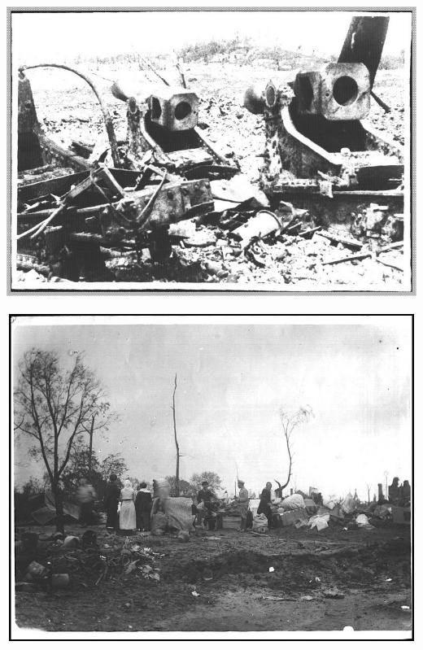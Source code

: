 \begin{center}
\includegraphics[width=\textwidth]{chast-vosp/zver/vz006.jpg}
\end{center}
\vspace*{\fill}

\newpage

\vspace*{\fill}
\begin{center}
\includegraphics[width=\textwidth]{chast-vosp/zver/vz007.jpg}
\end{center}

